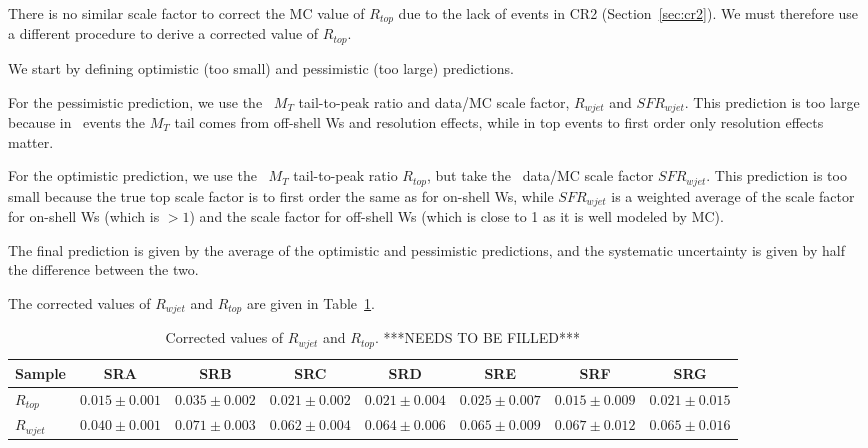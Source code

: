
There is no similar scale factor to correct the MC value of $R_{top}$ due to the lack of events in CR2 (Section~\ref{sec:cr2}).
We must therefore use a different procedure to derive a corrected value of $R_{top}$.

We start by defining optimistic (too small) and pessimistic (too large) predictions. 

For the pessimistic prediction, we use the \wjets\ $M_T$ tail-to-peak ratio and data/MC scale factor, $R_{wjet}$ and $SFR_{wjet}$.
This prediction is too large because in \wjets\ events the $M_T$ tail comes from
off-shell Ws and resolution effects, while in top events to first order
only resolution effects matter.

For the optimistic prediction, we use the \ttsl\ $M_T$ tail-to-peak ratio $R_{top}$, but take the \wjets\ data/MC scale factor $SFR_{wjet}$.
This prediction is too small because
the true top scale factor is to first order the same as for on-shell Ws, 
while $SFR_{wjet}$ is a weighted average of the
scale factor for on-shell Ws (which is $>1$) and the
scale factor for off-shell Ws (which is close to 1 as it is well modeled by MC). 

The final prediction is given by the average of the optimistic and pessimistic predictions, and
the systematic uncertainty is given by half the difference between the two.

The corrected values of $R_{wjet}$ and $R_{top}$ are given in Table~\ref{tab:ttpcorr}.

\begin{table}[!h]
\begin{center}
{\footnotesize
\begin{tabular}{l||c|c|c|c|c|c|c}
\hline
Sample              & SRA & SRB & SRC & SRD & SRE & SRF & SRG\\
\hline
\hline
$R_{top}$ 	  & $0.015 \pm 0.001$  & $0.035 \pm 0.002$  & $0.021 \pm 0.002$  & $0.021 \pm 0.004$  & $0.025 \pm 0.007$  & $0.015 \pm 0.009$  & $0.021 \pm 0.015$  \\
$R_{wjet}$ 	  & $0.040 \pm 0.001$  & $0.071 \pm 0.003$  & $0.062 \pm 0.004$  & $0.064 \pm 0.006$  & $0.065 \pm 0.009$  & $0.067 \pm 0.012$  & $0.065 \pm 0.016$  \\
\hline
\end{tabular}}
\caption{  Corrected values of $R_{wjet}$ and $R_{top}$.
***NEEDS TO BE FILLED***  
\label{tab:ttpcorr}}
\end{center}
\end{table}

\clearpage